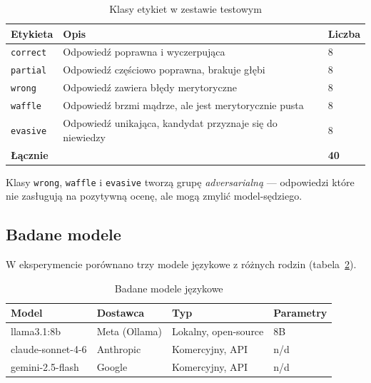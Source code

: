 \documentclass[12pt, a4paper]{article}
\begin{document}
\begin{table}[H]
    \centering
    \caption{Klasy etykiet w zestawie testowym}
    \label{tab:labels}
    \begin{tabular}{@{}lll@{}}
        \toprule
        \textbf{Etykieta} & \textbf{Opis} & \textbf{Liczba} \\
        \midrule
        \texttt{correct}  & Odpowiedź poprawna i wyczerpująca & 8 \\
        \texttt{partial}  & Odpowiedź częściowo poprawna, brakuje głębi & 8 \\
        \texttt{wrong}    & Odpowiedź zawiera błędy merytoryczne & 8 \\
        \texttt{waffle}   & Odpowiedź brzmi mądrze, ale jest merytorycznie pusta & 8 \\
        \texttt{evasive}  & Odpowiedź unikająca, kandydat przyznaje się do niewiedzy & 8 \\
        \midrule
        \textbf{Łącznie}  & & \textbf{40} \\
        \bottomrule
    \end{tabular}
\end{table}

Klasy \texttt{wrong}, \texttt{waffle} i \texttt{evasive} tworzą grupę
\textit{adversarialną} — odpowiedzi które nie zasługują na pozytywną ocenę,
ale mogą zmylić model-sędziego.

\subsection{Badane modele}

W eksperymencie porównano trzy modele językowe z różnych rodzin
(tabela~\ref{tab:models}).

\begin{table}[H]
    \centering
    \caption{Badane modele językowe}
    \label{tab:models}
    \begin{tabular}{@{}llll@{}}
        \toprule
        \textbf{Model} & \textbf{Dostawca} & \textbf{Typ} & \textbf{Parametry} \\
        \midrule
        llama3.1:8b        & Meta (Ollama) & Lokalny, open-source & 8B  \\
        claude-sonnet-4-6  & Anthropic     & Komercyjny, API      & n/d \\
        gemini-2.5-flash   & Google        & Komercyjny, API      & n/d \\
        \bottomrule
    \end{tabular}
\end{table}
\end{document}
